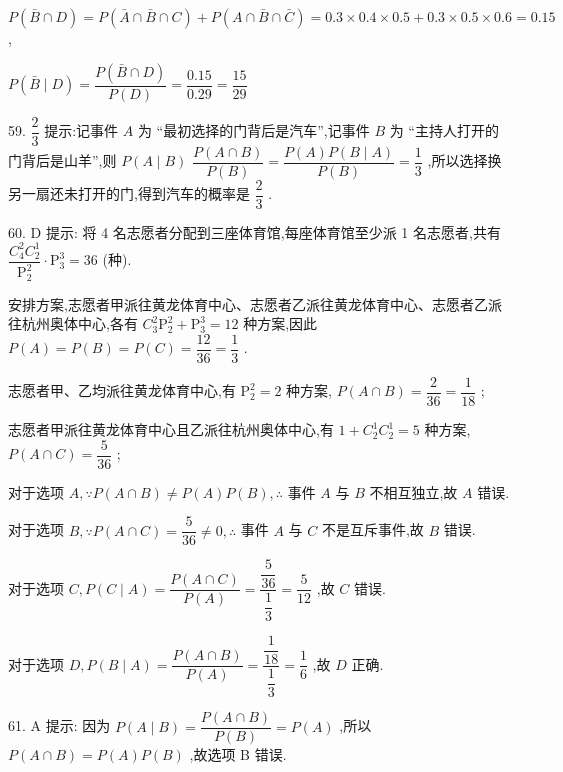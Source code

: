 $P\left( {\bar{B} \cap  D}\right)  = P\left( {\bar{A} \cap  \bar{B} \cap  C}\right)  + P\left( {A \cap  \bar{B} \cap  \bar{C}}\right)  = {0.3} \times  {0.4} \times  {0.5} + {0.3} \times  {0.5} \times  {0.6} = {0.15}$ ,

$P\left( {\bar{B} \mid  D}\right)  = \dfrac{P\left( {\bar{B} \cap  D}\right) }{P\left( D\right) } = \dfrac{0.15}{0.29} = \dfrac{15}{29}$

59. $\dfrac{2}{3}$ 提示:记事件 $A$ 为 “最初选择的门背后是汽车”,记事件 $B$ 为 “主持人打开的门背后是山羊”,则 $P\left( {A \mid  B}\right)$  $\dfrac{P\left( {A \cap  B}\right) }{P\left( B\right) } = \dfrac{P\left( A\right) P\left( {B \mid  A}\right) }{P\left( B\right) } = \dfrac{1}{3}$ ,所以选择换另一扇还未打开的门,得到汽车的概率是 $\dfrac{2}{3}$ .

60. D 提示: 将 4 名志愿者分配到三座体育馆,每座体育馆至少派 1 名志愿者,共有 $\dfrac{{C}_{4}^{2}{C}_{2}^{1}}{{\mathrm{P}}_{2}^{2}} \cdot  {\mathrm{P}}_{3}^{3} = {36}$ (种).

安排方案,志愿者甲派往黄龙体育中心、志愿者乙派往黄龙体育中心、志愿者乙派往杭州奥体中心,各有 ${C}_{3}^{2}{\mathrm{P}}_{2}^{2} + {\mathrm{P}}_{3}^{3} = {12}$ 种方案,因此 $P\left( A\right)  = P\left( B\right)  = P\left( C\right)  = \dfrac{12}{36} = \dfrac{1}{3}$ .

志愿者甲、乙均派往黄龙体育中心,有 ${\mathrm{P}}_{2}^{2} = 2$ 种方案, $P\left( {A \cap  B}\right)  = \dfrac{2}{36} = \dfrac{1}{18}$ ;

志愿者甲派往黄龙体育中心且乙派往杭州奥体中心,有 $1 + {C}_{2}^{1}{C}_{2}^{1} = 5$ 种方案, $P\left( {A \cap  C}\right)  = \dfrac{5}{36}$ ;

对于选项 $A,\because P\left( {A \cap  B}\right)  \neq  P\left( A\right) P\left( B\right) ,\therefore$ 事件 $A$ 与 $B$ 不相互独立,故 $A$ 错误.

对于选项 $B,\because P\left( {A \cap  C}\right)  = \dfrac{5}{36} \neq  0,\therefore$ 事件 $A$ 与 $C$ 不是互斥事件,故 $B$ 错误.

对于选项 $C,P\left( {C \mid  A}\right)  = \dfrac{P\left( {A \cap  C}\right) }{P\left( A\right) } = \dfrac{\dfrac{5}{36}}{\dfrac{1}{3}} = \dfrac{5}{12}$ ,故 $C$ 错误.

对于选项 $D,P\left( {B \mid  A}\right)  = \dfrac{P\left( {A \cap  B}\right) }{P\left( A\right) } = \dfrac{\dfrac{1}{18}}{\dfrac{1}{3}} = \dfrac{1}{6}$ ,故 $D$ 正确.

61. A 提示: 因为 $P\left( {A \mid  B}\right)  = \dfrac{P\left( {A \cap  B}\right) }{P\left( B\right) } = P\left( A\right)$ ,所以 $P\left( {A \cap  B}\right)  = P\left( A\right) P\left( B\right)$ ,故选项 B 错误.

